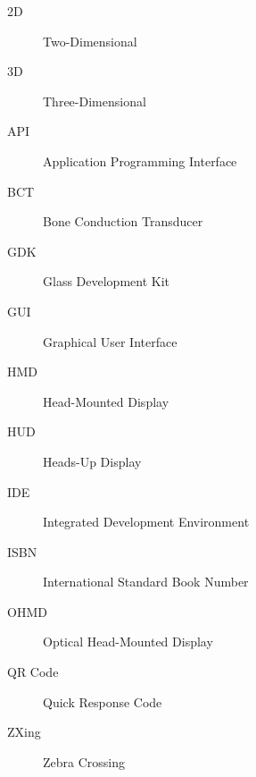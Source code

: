 \begin{description}
	\item [2D] Two-Dimensional
	\item [3D] Three-Dimensional
	\item [API] Application Programming Interface
	\item [BCT] Bone Conduction Transducer
	\item [GDK] Glass Development Kit
	\item [GUI] Graphical User Interface
	\item [HMD] Head-Mounted Display
	\item [HUD] Heads-Up Display
	\item [IDE] Integrated Development Environment
	\item [ISBN] International Standard Book Number
	\item [OHMD] Optical Head-Mounted Display
	\item [QR Code] Quick Response Code
	\item [ZXing] Zebra Crossing
\end{description}